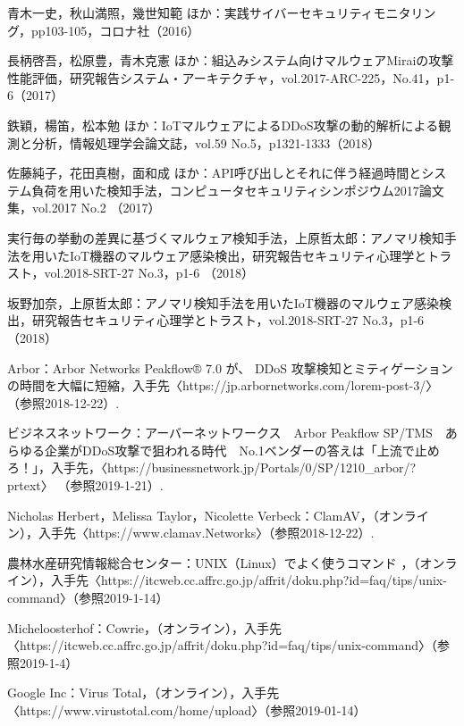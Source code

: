 \begin{thebibliography}{30}
        青木一史，秋山満照，幾世知範 ほか：実践サイバーセキュリティモニタリング，pp103-105，コロナ社（2016）
    

        
    
        長柄啓吾，松原豊，青木克憲 ほか：組込みシステム向けマルウェアMiraiの攻撃性能評価，研究報告システム・アーキテクチャ，vol.2017-ARC-225，No.41，p1-6（2017）
    
        鉄穎，楊笛，松本勉 ほか：IoTマルウェアによるDDoS攻撃の動的解析による観測と分析，情報処理学会論文誌，vol.59 No.5，p1321-1333（2018）

        佐藤純子，花田真樹，面和成 ほか：API呼び出しとそれに伴う経過時間とシステム負荷を用いた検知手法，コンピュータセキュリティシンポジウム2017論文集，vol.2017 No.2 （2017）

        実行毎の挙動の差異に基づくマルウェア検知手法，上原哲太郎：アノマリ検知手法を用いたIoT機器のマルウェア感染検出，研究報告セキュリティ心理学とトラスト，vol.2018-SRT-27 No.3，p1-6 （2018）

        坂野加奈，上原哲太郎：アノマリ検知手法を用いたIoT機器のマルウェア感染検出，研究報告セキュリティ心理学とトラスト，vol.2018-SRT-27 No.3，p1-6 （2018）

         Arbor：Arbor Networks Peakflow® 7.0 が、 DDoS 攻撃検知とミティゲーションの時間を大幅に短縮，入手先〈https:\slash\slash{}jp.arbornetworks.com\slash{}lorem-post-3\slash{}〉 （参照2018-12-22）.
    
         ビジネスネットワーク：アーバーネットワークス　Arbor Peakflow SP/TMS　あらゆる企業がDDoS攻撃で狙われる時代　No.1ベンダーの答えは「上流で止めろ！」，入手先，〈https:\slash\slash{}businessnetwork.jp\slash{}Portals\slash{}0\slash{}SP\slash{}1210\_arbor\slash{}?prtext〉 （参照2019-1-21）.

         Nicholas Herbert，Melissa Taylor，Nicolette Verbeck：ClamAV，（オンライン），入手先〈https:\slash\slash{}www.clamav.Networks〉（参照2018-12-22）.
    
       農林水産研究情報総合センター：UNIX（Linux）でよく使うコマンド ，（オンライン），入手先〈https:\slash\slash{}itcweb.cc.affrc.go.jp\slash{}affrit/doku.php?id=faq\slash{}tips\slash{}unix-command〉（参照2019-1-14）
    
        Micheloosterhof：Cowrie，（オンライン），入手先〈https:\slash\slash{}itcweb.cc.affrc.go.jp\slash{}affrit\slash{}doku.php?id=faq\slash{}tips/unix-command〉（参照2019-1-4）
    
        Google Inc：Virus Total，（オンライン），入手先〈https:\slash\slash{}www.virustotal.com\slash{}home\slash{}upload〉（参照2019-01-14）
\end{thebibliography}
